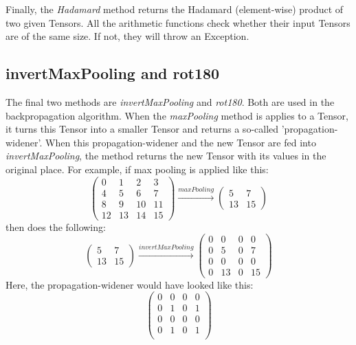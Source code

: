 \documentclass[12pt, titlepage]{article}
\begin{document}
		Finally, the \textit{Hadamard} method returns the Hadamard (element-wise) product of two given Tensors. All the arithmetic functions check whether their input Tensors are of the same size. If not, they will throw an Exception.
		
		\subsection{invertMaxPooling and rot180}
		The final two methods are \textit{invertMaxPooling} and \textit{rot180}. Both are used in the backpropagation algorithm. When the \textit{maxPooling} method is applies to a Tensor, it turns this Tensor into a smaller Tensor and returns a so-called 'propagation-widener'. When this propagation-widener and the new Tensor are fed into \textit{invertMaxPooling}, the method returns the new Tensor with its values in the original place. For example, if max pooling is applied like this:
		\begin{equation*}
		\begin{pmatrix}
		0 &1 &2 &3\\
		4 &5 &6 &7\\
		8 &9 &10 &11\\
		12 &13 &14 &15
		\end{pmatrix}\stackrel{maxPooling}{\longrightarrow} \begin{pmatrix}
		5 & 7\\
		13 &15
		\end{pmatrix}
		\end{equation*}
		then  does the following:
		\begin{equation*}
		\begin{pmatrix}
		5 & 7\\
		13 &15
		\end{pmatrix} \stackrel{invertMaxPooling}{\longrightarrow}\begin{pmatrix}
		0 &0 &0 &0\\
		0 &5 &0 &7\\
		0 &0 &0 &0\\
		0 &13 &0 &15
		\end{pmatrix}
		\end{equation*}
		Here, the propagation-widener would have looked like this:
		\begin{equation*}
		\begin{pmatrix}
		0 &0 &0 &0\\
		0 &1 &0 &1\\
		0 &0 &0 &0\\
		0 &1 &0 &1\\
		\end{pmatrix}
		\end{equation*}
		
\end{document}
